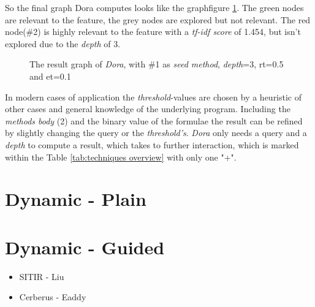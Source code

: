 So the final graph Dora computes looks like the graphfigure \ref{dia:dora result}. The green nodes are relevant to the feature, the grey nodes are explored but not relevant. The red node(\#2) is highly relevant to the feature with a \emph{tf-idf score} of 1.454, but isn't explored due to the \textit{depth} of 3.
\begin{figure}[h]
	\centering
	\caption{The result graph of \textit{Dora}, with \#1 as \textit{seed method}, \textit{depth}=3, rt=0.5 and et=0.1}
	\label{dia:dora result}
\end{figure}
 In modern cases of application the \textit{threshold}-values are chosen by a heuristic of other cases and general knowledge of the underlying program. Including the \textit{methods body} (2) and the binary value of the formulae the result can be refined by slightly changing the query or the \textit{threshold's}. \newline
\emph{Dora} only needs a query and a \textit{depth} to compute a result, which takes to further interaction, which is marked within the Table \ref{tab:techniques overview} with only one "+".

\section{Dynamic - Plain}


\section{Dynamic - Guided}
\begin{itemize}
\item SITIR - Liu
\item Cerberus - Eaddy
\end{itemize}


